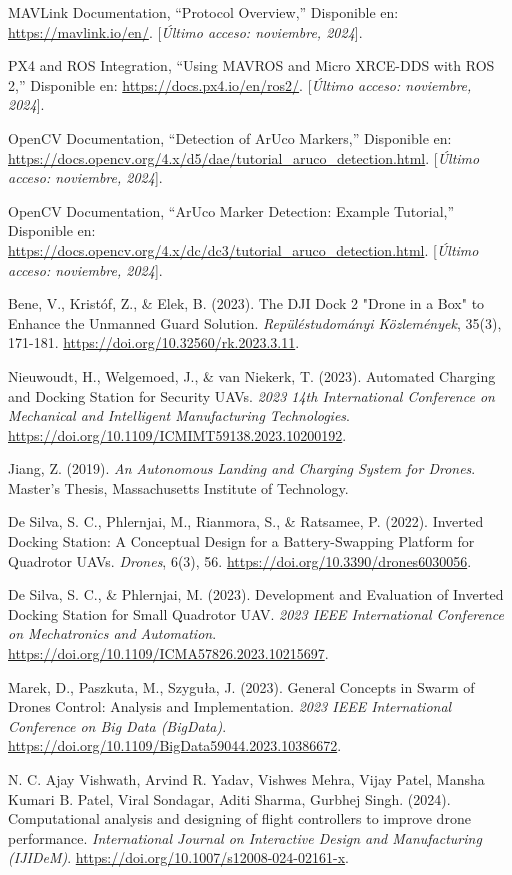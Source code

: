 \begin{thebibliography}{30}
    MAVLink Documentation, ``Protocol Overview,'' Disponible en: \url{https://mavlink.io/en/}. [\textit{Último acceso: noviembre, 2024}].

    PX4 and ROS Integration, ``Using MAVROS and Micro XRCE-DDS with ROS 2,'' Disponible en: \url{https://docs.px4.io/en/ros2/}. [\textit{Último acceso: noviembre, 2024}].

    OpenCV Documentation, ``Detection of ArUco Markers,'' Disponible en: \url{https://docs.opencv.org/4.x/d5/dae/tutorial_aruco_detection.html}. [\textit{Último acceso: noviembre, 2024}].

    OpenCV Documentation, ``ArUco Marker Detection: Example Tutorial,'' Disponible en: \url{https://docs.opencv.org/4.x/dc/dc3/tutorial_aruco_detection.html}. [\textit{Último acceso: noviembre, 2024}].

     Bene, V., Kristóf, Z., \& Elek, B. (2023). The DJI Dock 2 "Drone in a Box" to Enhance the Unmanned Guard Solution. \textit{Repüléstudományi Közlemények}, 35(3), 171-181. \url{https://doi.org/10.32560/rk.2023.3.11}.
    
     Nieuwoudt, H., Welgemoed, J., \& van Niekerk, T. (2023). Automated Charging and Docking Station for Security UAVs. \textit{2023 14th International Conference on Mechanical and Intelligent Manufacturing Technologies}. \url{https://doi.org/10.1109/ICMIMT59138.2023.10200192}.
    
     Jiang, Z. (2019). \textit{An Autonomous Landing and Charging System for Drones}. Master's Thesis, Massachusetts Institute of Technology.
        
     De Silva, S. C., Phlernjai, M., Rianmora, S., \& Ratsamee, P. (2022). Inverted Docking Station: A Conceptual Design for a Battery-Swapping Platform for Quadrotor UAVs. \textit{Drones}, 6(3), 56. \url{https://doi.org/10.3390/drones6030056}.
    
     De Silva, S. C., \& Phlernjai, M. (2023). Development and Evaluation of Inverted Docking Station for Small Quadrotor UAV. \textit{2023 IEEE International Conference on Mechatronics and Automation}. \url{https://doi.org/10.1109/ICMA57826.2023.10215697}.
    
     Marek, D., Paszkuta, M., Szyguła, J. (2023). General Concepts in Swarm of Drones Control: Analysis and Implementation. \textit{2023 IEEE International Conference on Big Data (BigData)}. \url{https://doi.org/10.1109/BigData59044.2023.10386672}.

    N. C. Ajay Vishwath, Arvind R. Yadav, Vishwes Mehra, Vijay Patel, Mansha Kumari B. Patel, Viral Sondagar, Aditi Sharma, Gurbhej Singh. (2024). Computational analysis and designing of flight controllers to improve drone performance. \textit{International Journal on Interactive Design and Manufacturing (IJIDeM)}. \url{https://doi.org/10.1007/s12008-024-02161-x}.
    

\end{thebibliography}

